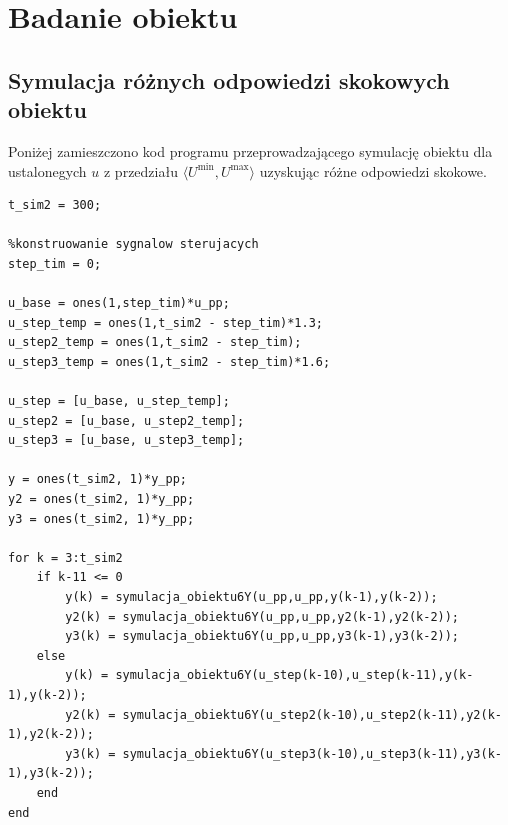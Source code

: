 \chapter{Badanie obiektu}
\section{Symulacja różnych odpowiedzi skokowych obiektu}

Poniżej zamieszczono kod programu przeprowadzającego symulację obiektu dla ustalonegych $u$  z przedziału $ \langle  U^{\textrm{min}}, U^{\textrm{max}}\rangle $ uzyskując różne odpowiedzi skokowe. 


\begin{lstlisting}[style=Matlab-editor]
t_sim2 = 300;

%konstruowanie sygnalow sterujacych
step_tim = 0;

u_base = ones(1,step_tim)*u_pp;
u_step_temp = ones(1,t_sim2 - step_tim)*1.3;
u_step2_temp = ones(1,t_sim2 - step_tim);
u_step3_temp = ones(1,t_sim2 - step_tim)*1.6;

u_step = [u_base, u_step_temp];
u_step2 = [u_base, u_step2_temp];
u_step3 = [u_base, u_step3_temp];

y = ones(t_sim2, 1)*y_pp;
y2 = ones(t_sim2, 1)*y_pp;
y3 = ones(t_sim2, 1)*y_pp;

for k = 3:t_sim2
    if k-11 <= 0
        y(k) = symulacja_obiektu6Y(u_pp,u_pp,y(k-1),y(k-2));
        y2(k) = symulacja_obiektu6Y(u_pp,u_pp,y2(k-1),y2(k-2));
        y3(k) = symulacja_obiektu6Y(u_pp,u_pp,y3(k-1),y3(k-2));
    else
        y(k) = symulacja_obiektu6Y(u_step(k-10),u_step(k-11),y(k-1),y(k-2));
        y2(k) = symulacja_obiektu6Y(u_step2(k-10),u_step2(k-11),y2(k-1),y2(k-2));
        y3(k) = symulacja_obiektu6Y(u_step3(k-10),u_step3(k-11),y3(k-1),y3(k-2));      
    end
end
\end{lstlisting}

